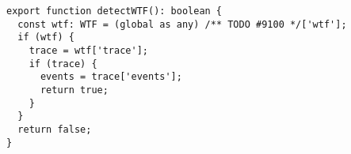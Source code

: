 \begin{verbatim}
export function detectWTF(): boolean {
  const wtf: WTF = (global as any) /** TODO #9100 */['wtf'];
  if (wtf) {
    trace = wtf['trace'];
    if (trace) {
      events = trace['events'];
      return true;
    }
  }
  return false;
}
\end{verbatim}
